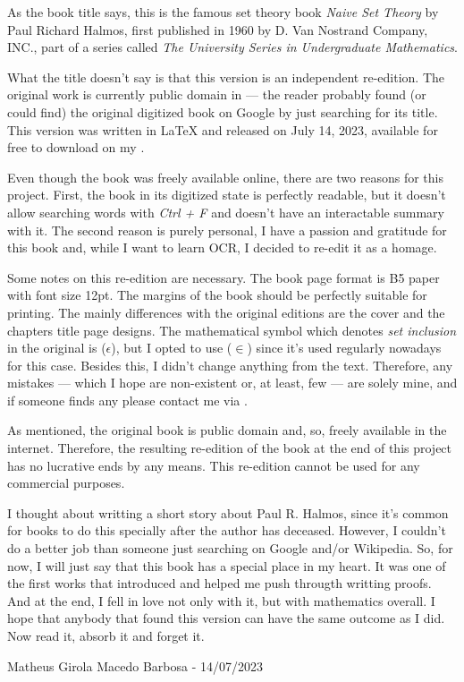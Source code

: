 As the book title says, this is the famous set theory book \textit{Naive Set Theory} by Paul Richard Halmos, first published in 1960 by D. Van Nostrand Company, INC., part of a series called \textit{ The University Series in Undergraduate Mathematics}.

What the title doesn't say is that this version is an independent re-edition. The original work is currently public domain in \href{https://babel.hathitrust.org}{\color{blue}{Hathi Trust Digital Library}} — the reader probably found (or could find) the original digitized book on Google by just searching for its title. This version was written in LaTeX and released on July 14, 2023, available for free to download on my \href{https://github.com/matheusgirola/Halmos-Naive-Set-Theory-OCR-LaTeX-Reedition}{\color{blue}{Github repository}}.

Even though the book was freely available online, there are two reasons for this project. First, the book in its digitized state is perfectly readable, but it doesn't allow searching words with \textit{Ctrl + F} and doesn't have an interactable summary with it. The second reason is purely personal, I have a passion and gratitude for this book and, while I want to learn OCR, I decided to re-edit it as a homage.

Some notes on this re-edition are necessary. The book page format is B5 paper with font size 12pt. The margins of the book should be perfectly suitable for printing. The mainly differences with the original editions are the cover and the chapters title page designs. The mathematical symbol which denotes \textit{set inclusion} in the original is ($\epsilon$), but I opted to use ($\in$) since it's used regularly nowadays for this case. Besides this, I didn't change anything from the text. Therefore, any mistakes — which I hope are non-existent or, at least, few —  are solely mine, and if someone finds any please contact me via  \href{mailto:matheusgirola@gmail.com}{\color{blue}{e-mail}}.

As mentioned, the original book is public domain and, so, freely available in the internet. Therefore, the resulting re-edition of the book at the end of this project has no lucrative ends by any means. This re-edition cannot be used for any commercial purposes.

I thought about writting a short story about Paul R. Halmos, since it's common for books to do this specially after the author has deceased. However, I couldn't do a better job than someone just searching on Google and/or Wikipedia. So, for now, I will just say that this book has a special place in my heart. It was one of the first works that introduced and helped me push througth writting proofs. And at the end, I fell in love not only with it, but with mathematics overall. I hope that anybody that found this version can have the same outcome as I did. Now read it, absorb it and forget it.

\begin{flushright}
Matheus Girola Macedo Barbosa - 14/07/2023
\end{flushright}
